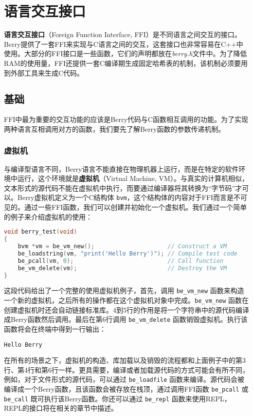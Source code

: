 \chapter{语言交互接口}

\textbf{语言交互接口}（Foreign Function Interface, FFI）是不同语言之间交互的接口。Berry提供了一套FFI来实现与C语言之间的交互，这套接口也非常容易在C++中使用。大部分的FFI接口是一些函数，它们的声明都放在\textsl{berry.h}文件中。为了降低RAM的使用量，FFI还提供一套C编译期生成固定哈希表的机制，该机制必须要用到外部工具来生成C代码。

\section{基础}

FFI中最为重要的交互功能的应该是Berry代码与C函数相互调用的功能。为了实现两种语言互相调用对方的函数，我们要先了解Berry函数的参数传递机制。

\subsection{虚拟机}

与编译型语言不同，Berry语言不能直接在物理机器上运行，而是在特定的软件环境中运行，这个环境就是\textbf{虚拟机}（Virtual Machine, VM）。与真实的计算机相似，文本形式的源代码不能在虚拟机中执行，而要通过编译器将其转换为``字节码''才可以。Berry虚拟机定义为一个C结构体 \texttt{bvm}，这个结构体的内容对于FFI而言是不可见的。通过一些FFI函数，我们可以创建并初始化一个虚拟机。我们通过一个简单的例子来介绍虚拟机的使用：
\begin{lstlisting}[language=c, style=berry]
void berry_test(void)
{
    bvm *vm = be_vm_new();                     // Construct a VM
    be_loadstring(vm, "print('Hello Berry')"); // Compile test code
    be_pcall(vm, 0);                           // Call function
    be_vm_delete(vm);                          // Destroy the VM
}
\end{lstlisting}
这段代码给出了一个完整的使用虚拟机例子，首先，调用 \texttt{be\_vm\_new} 函数来构造一个新的虚拟机，之后所有的操作都在这个虚拟机对象中完成。\texttt{be\_vm\_new} 函数在创建虚拟机时还会自动链接标准库。4到5行的作用是将一个字符串中的源代码编译成Berry函数然后调用。最后在第6行调用 \texttt{be\_vm\_delete} 函数销毁虚拟机。执行该函数将会在终端中得到一行输出：
\begin{lstlisting}[numbers=none]
Hello Berry
\end{lstlisting}

在所有的场景之下，虚拟机的构造、库加载以及销毁的流程都和上面例子中的第3行、第4行和第6行一样。更具需要，编译或者加载源代码的方式可能会有所不同，例如，对于文件形式的源代码，可以通过 \texttt{be\_loadfile} 函数来编译。源代码会被编译成一个Berry函数，且该函数会被存放在栈顶，通过调用FFI函数 \texttt{be\_pcall} 或 \texttt{be\_call} 既可执行该Berry函数。你还可以通过 \texttt{be\_repl} 函数来使用REPL，REPL的接口将在相关的章节中描述。

